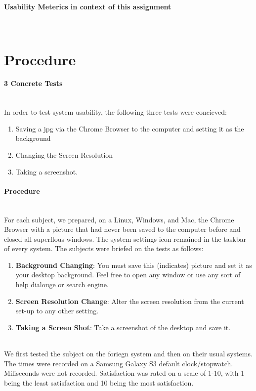 \documentclass[12pt, onesided, letterpaper]{report}
\begin{document}
\paragraph*{Usability Meterics in context of this assignment}~\\
 

\pagebreak

\section*{Procedure}

\paragraph*{3 Concrete Tests} ~\\
In order to test system usability, the following three tests were concieved:
\begin{enumerate}
\item Saving a jpg via the Chrome Browser to the computer and setting it as the background
\item Changing the Screen Resolution
\item Taking a screenshot.
\end{enumerate}

\paragraph*{Procedure} ~\\
For each subject, we prepared, on a Linux, Windows, and Mac, the Chrome Browser with a picture that had never been saved to the computer before and closed all superflous windows. The system settings icon remained in the taskbar of every system.  The subjects were briefed on the tests as follows:
\begin{enumerate}
\item \textbf{Background Changing}: You must save this (indicates) picture and set it as your desktop background.  Feel free to open any window or use any sort of help dialouge or search engine.
\item \textbf{Screen Resolution Change}: Alter the screen resolution from the current set-up to any other setting.
\item \textbf{Taking a Screen Shot}: Take a screenshot of the desktop and save it.
\end{enumerate}\\
We first tested the subject on the foriegn system and then on their usual systems. The times were recorded on a Samsung Galaxy S3 default clock/stopwatch.  Miliseconds were not recorded.  Satisfaction was rated on a scale of 1-10, with 1 being the least satisfaction and 10 being the most satisfaction.
\pagebreak
\end{document}
